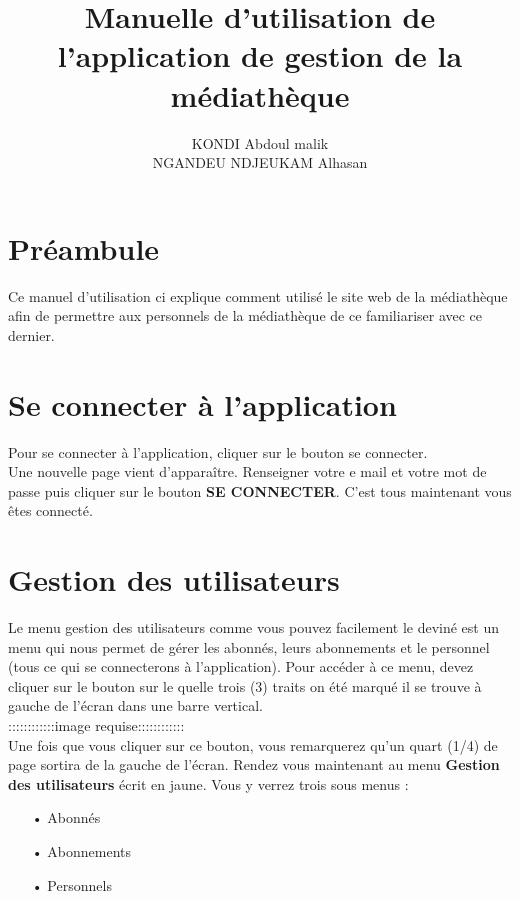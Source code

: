 \documentclass[12pt,a4paper]{article}
\author{KONDI Abdoul malik \\ NGANDEU NDJEUKAM Alhasan}
\title{Manuelle d'utilisation de l'application de gestion de la médiathèque}
\begin{document}
\maketitle
\tableofcontents
\newpage

\section{Préambule}
Ce manuel d'utilisation ci explique comment utilisé le site web de la médiathèque afin
de permettre aux personnels de la médiathèque de ce familiariser avec ce dernier.

\newpage
\section{Se connecter à l'application}
Pour se connecter à l'application, cliquer sur le bouton se connecter.\\
Une nouvelle page vient d'apparaître. Renseigner votre e mail et votre mot de passe 
puis cliquer sur le bouton \textbf{SE CONNECTER}. C'est tous maintenant vous êtes 
connecté.


\newpage
\section{Gestion des utilisateurs}
Le menu gestion des utilisateurs comme vous pouvez facilement le deviné est un menu qui
nous permet de gérer les abonnés, leurs abonnements et le personnel (tous ce qui se
connecterons à l'application). Pour accéder à ce menu, devez cliquer sur le bouton sur le
quelle trois (3) traits on été marqué il se trouve à gauche de l'écran dans une barre
vertical. \\

::::::::::::image requise::::::::::::\\

Une fois que vous cliquer sur ce bouton, vous remarquerez qu'un quart (1/4) de page 
sortira de la gauche de l'écran. Rendez vous maintenant au menu \textbf{Gestion des
utilisateurs} écrit en jaune. Vous y verrez trois sous menus :
\begin{itemize}
\item[•] Abonnés
\item[•] Abonnements
\item[•] Personnels
\end{itemize}
\end{document}
